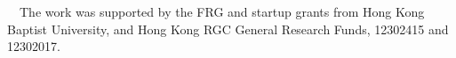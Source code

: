 \documentclass[11pt,reqno,twoside]{amsart}
\theoremstyle{definition}
\theoremstyle{remark}
\numberwithin{equation}{section}
\begin{document}
\bigskip
%
%
%
%


~~The work was supported by the FRG and startup grants from Hong Kong Baptist University, and Hong Kong RGC General Research Funds, 12302415 and 12302017.
\end{document}

